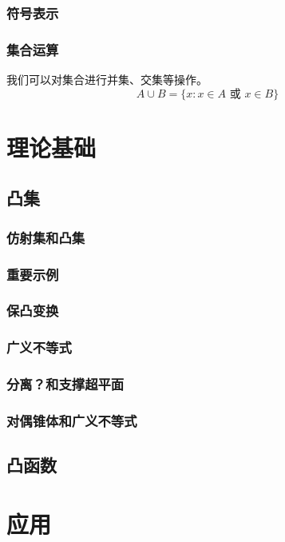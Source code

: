 \documentclass[12pt,a4paper]{book}
\begin{document}
\section{符号表示}

\section{集合运算}
我们可以对集合进行并集、交集等操作。
$$
A \cup B = \{x : x \in A \text{ 或 } x \in B\}
$$
\label{eq:union}

\part{理论基础}
\chapter{凸集}
\section{仿射集和凸集}
\section{重要示例}
\section{保凸变换}
\section{广义不等式}
\section{分离？和支撑超平面}
\section{对偶锥体和广义不等式}

\chapter{凸函数}

\part{应用}




\printindex
\end{document}
